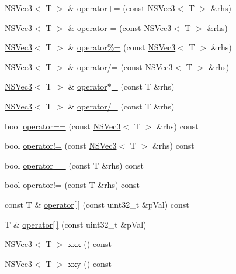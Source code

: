 \begin{DoxyCompactItemize}
\item 
\hyperlink{structNSVec3}{N\-S\-Vec3}$<$ T $>$ \& \hyperlink{structNSVec3_a7801453cffc29ba1d7adad1e687e4081}{operator+=} (const \hyperlink{structNSVec3}{N\-S\-Vec3}$<$ T $>$ \&rhs)
\item 
\hyperlink{structNSVec3}{N\-S\-Vec3}$<$ T $>$ \& \hyperlink{structNSVec3_aa8e9f7634bebf2a3da8da05543281d0a}{operator-\/=} (const \hyperlink{structNSVec3}{N\-S\-Vec3}$<$ T $>$ \&rhs)
\item 
\hyperlink{structNSVec3}{N\-S\-Vec3}$<$ T $>$ \& \hyperlink{structNSVec3_aff114e4cfc996ccb57964ffd3bcf9360}{operator\%=} (const \hyperlink{structNSVec3}{N\-S\-Vec3}$<$ T $>$ \&rhs)
\item 
\hyperlink{structNSVec3}{N\-S\-Vec3}$<$ T $>$ \& \hyperlink{structNSVec3_a79d6275c13fed12feafd8ee3455f0f19}{operator/=} (const \hyperlink{structNSVec3}{N\-S\-Vec3}$<$ T $>$ \&rhs)
\item 
\hyperlink{structNSVec3}{N\-S\-Vec3}$<$ T $>$ \& \hyperlink{structNSVec3_a18bca74b1c42818f7ab356acc2d0ea2e}{operator$\ast$=} (const T \&rhs)
\item 
\hyperlink{structNSVec3}{N\-S\-Vec3}$<$ T $>$ \& \hyperlink{structNSVec3_abf77bc7f851b583868850ce58784fad2}{operator/=} (const T \&rhs)
\item 
bool \hyperlink{structNSVec3_a343df04d296d9e647a0974a6ca7a95de}{operator==} (const \hyperlink{structNSVec3}{N\-S\-Vec3}$<$ T $>$ \&rhs) const 
\item 
bool \hyperlink{structNSVec3_acba1e7cea7a802a05da51ca10aa20741}{operator!=} (const \hyperlink{structNSVec3}{N\-S\-Vec3}$<$ T $>$ \&rhs) const 
\item 
bool \hyperlink{structNSVec3_aa6c1766a9454a42b33bc3c9d113d84a9}{operator==} (const T \&rhs) const 
\item 
bool \hyperlink{structNSVec3_af597374c34da0cc19eb9d532e42f0f62}{operator!=} (const T \&rhs) const 
\item 
const T \& \hyperlink{structNSVec3_a61d4c32aa1d7ad965345d38d38695b00}{operator\mbox{[}$\,$\mbox{]}} (const uint32\-\_\-t \&p\-Val) const 
\item 
T \& \hyperlink{structNSVec3_a29be3a6728a1951c1c5a9d933eeaabb1}{operator\mbox{[}$\,$\mbox{]}} (const uint32\-\_\-t \&p\-Val)
\item 
\hyperlink{structNSVec3}{N\-S\-Vec3}$<$ T $>$ \hyperlink{structNSVec3_a0e592c13b85d0c7c98bfa839b2cb873d}{xxx} () const 
\item 
\hyperlink{structNSVec3}{N\-S\-Vec3}$<$ T $>$ \hyperlink{structNSVec3_a448470ffffaee0ecfa1f01f002847032}{xxy} () const 

\end{DoxyCompactItemize}
